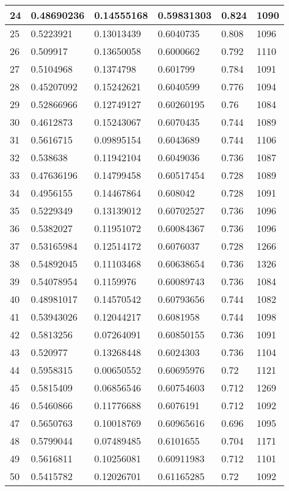 \begin{longtable}{|l|l|l|l|l|l|}
24 & 0.48690236 & 0.14555168 & 0.59831303 & 0.824 & 1090 \\ \hline 
25 & 0.5223921 & 0.13013439 & 0.6040735 & 0.808 & 1096 \\ \hline 
26 & 0.509917 & 0.13650058 & 0.6000662 & 0.792 & 1110 \\ \hline 
27 & 0.5104968 & 0.1374798 & 0.601799 & 0.784 & 1091 \\ \hline 
28 & 0.45207092 & 0.15242621 & 0.6040599 & 0.776 & 1094 \\ \hline 
29 & 0.52866966 & 0.12749127 & 0.60260195 & 0.76 & 1084 \\ \hline 
30 & 0.4612873 & 0.15243067 & 0.6070435 & 0.744 & 1089 \\ \hline 
31 & 0.5616715 & 0.09895154 & 0.6043689 & 0.744 & 1106 \\ \hline 
32 & 0.538638 & 0.11942104 & 0.6049036 & 0.736 & 1087 \\ \hline 
33 & 0.47636196 & 0.14799458 & 0.60517454 & 0.728 & 1089 \\ \hline 
34 & 0.4956155 & 0.14467864 & 0.608042 & 0.728 & 1091 \\ \hline 
35 & 0.5229349 & 0.13139012 & 0.60702527 & 0.736 & 1096 \\ \hline 
36 & 0.5382027 & 0.11951072 & 0.60084367 & 0.736 & 1096 \\ \hline 
37 & 0.53165984 & 0.12514172 & 0.6076037 & 0.728 & 1266 \\ \hline 
38 & 0.54892045 & 0.11103468 & 0.60638654 & 0.736 & 1326 \\ \hline 
39 & 0.54078954 & 0.1159976 & 0.60089743 & 0.736 & 1084 \\ \hline 
40 & 0.48981017 & 0.14570542 & 0.60793656 & 0.744 & 1082 \\ \hline 
41 & 0.53943026 & 0.12044217 & 0.6081958 & 0.744 & 1098 \\ \hline 
42 & 0.5813256 & 0.07264091 & 0.60850155 & 0.736 & 1091 \\ \hline 
43 & 0.520977 & 0.13268448 & 0.6024303 & 0.736 & 1104 \\ \hline 
44 & 0.5958315 & 0.00650552 & 0.60695976 & 0.72 & 1121 \\ \hline 
45 & 0.5815409 & 0.06856546 & 0.60754603 & 0.712 & 1269 \\ \hline 
46 & 0.5460866 & 0.11776688 & 0.6076191 & 0.712 & 1092 \\ \hline 
47 & 0.5650763 & 0.10018769 & 0.60965616 & 0.696 & 1095 \\ \hline 
48 & 0.5799044 & 0.07489485 & 0.6101655 & 0.704 & 1171 \\ \hline 
49 & 0.5616811 & 0.10256081 & 0.60911983 & 0.712 & 1101 \\ \hline 
50 & 0.5415782 & 0.12026701 & 0.61165285 & 0.72 & 1092 \\ \hline 
\end{longtable}
